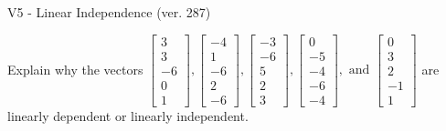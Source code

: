 \begin{exercise}
  \begin{exerciseTitle}V5 - Linear Independence (ver. 287)\end{exerciseTitle}
  \begin{exerciseStatement}
    Explain why the vectors \(\left[\begin{array}{r}
3 \\
3 \\
-6 \\
0 \\
1
\end{array}\right] , \left[\begin{array}{r}
-4 \\
1 \\
-6 \\
2 \\
-6
\end{array}\right] , \left[\begin{array}{r}
-3 \\
-6 \\
5 \\
2 \\
3
\end{array}\right] , \left[\begin{array}{r}
0 \\
-5 \\
-4 \\
-6 \\
-4
\end{array}\right] , \text{ and } \left[\begin{array}{r}
0 \\
3 \\
2 \\
-1 \\
1
\end{array}\right]\) are linearly dependent or linearly independent.	



\end{exerciseStatement}
\end{exercise}
